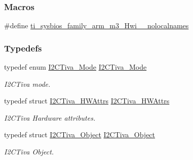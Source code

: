 \subsubsection*{Macros}
\begin{DoxyCompactItemize}
\item 
\#define \hyperlink{_i2_c_tiva_8h_aaa17ecf48f5762e2e1bdb0bab8aacf0c}{ti\+\_\+sysbios\+\_\+family\+\_\+arm\+\_\+m3\+\_\+\+Hwi\+\_\+\+\_\+nolocalnames}
\end{DoxyCompactItemize}
\subsubsection*{Typedefs}
\begin{DoxyCompactItemize}
\item 
typedef enum \hyperlink{_i2_c_tiva_8h_ab6fdad6d12d7ec02e2acb6fbc1ab85af}{I2\+C\+Tiva\+\_\+\+Mode} \hyperlink{_i2_c_tiva_8h_ae29c199bdb69bc3c7e6b1bf4ebba76f0}{I2\+C\+Tiva\+\_\+\+Mode}
\begin{DoxyCompactList}\small\item\em I2\+C\+Tiva mode. \end{DoxyCompactList}\item 
typedef struct \hyperlink{struct_i2_c_tiva___h_w_attrs}{I2\+C\+Tiva\+\_\+\+H\+W\+Attrs} \hyperlink{_i2_c_tiva_8h_af20903ad2ff3e34d27132e11aef68ad5}{I2\+C\+Tiva\+\_\+\+H\+W\+Attrs}
\begin{DoxyCompactList}\small\item\em I2\+C\+Tiva Hardware attributes. \end{DoxyCompactList}\item 
typedef struct \hyperlink{struct_i2_c_tiva___object}{I2\+C\+Tiva\+\_\+\+Object} \hyperlink{_i2_c_tiva_8h_a56bbf0bf756fabe1c1c6b905a1b88ee7}{I2\+C\+Tiva\+\_\+\+Object}
\begin{DoxyCompactList}\small\item\em I2\+C\+Tiva Object. \end{DoxyCompactList}\end{DoxyCompactItemize}
